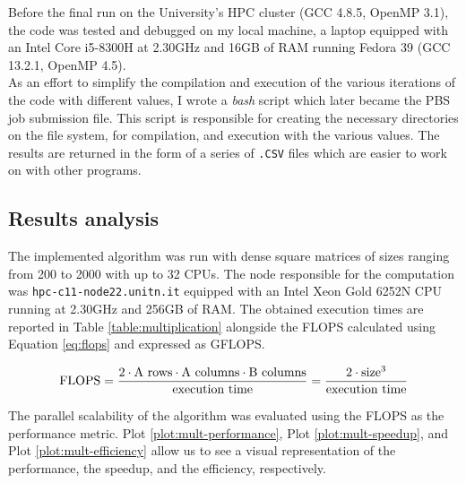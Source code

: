 

Before the final run on the University's HPC cluster (GCC 4.8.5, OpenMP 3.1), %
the code was tested and debugged on my local machine, a laptop equipped with an %
Intel\textsuperscript{\textregistered} Core\textsuperscript{\texttrademark} %
i5-8300H at 2.30GHz and 16GB of RAM running Fedora 39 (GCC 13.2.1, OpenMP 4.5).\\%
As an effort to simplify the compilation and execution of the various iterations %
of the code with different values, I wrote a \textit{bash} script which later %
became the PBS job submission file. This script is responsible for creating the %
necessary directories on the file system, for compilation, and execution with %
the various values. The results are returned in the form of a series of %
\texttt{.CSV} files which are easier to work on with other programs.

\subsection*{Results analysis}
The implemented algorithm was run with dense square matrices of sizes ranging %
from 200 to 2000 with up to 32 CPUs. The node responsible for the computation was %
\texttt{hpc-c11-node22.unitn.it} equipped with an Intel\textsuperscript{\textregistered} %
Xeon\textsuperscript{\textregistered} Gold 6252N CPU running at 2.30GHz and 256GB %
of RAM. The obtained execution times are reported in Table \ref{table:multiplication} %
alongside the FLOPS calculated using Equation \ref{eq:flops} and expressed as %
GFLOPS.

\begin{equation}
    \label{eq:flops}
    \textnormal{FLOPS}=\frac{%
            2 \cdot \textnormal{A rows} \cdot \textnormal{A columns} \cdot %
            \textnormal{B columns}
        }{\textnormal{execution time}}=
        \frac{%
            2 \cdot \textnormal{size}^3}{\textnormal{execution time}}
\end{equation}



The parallel scalability of the algorithm was evaluated using the FLOPS as the %
performance metric. Plot \ref{plot:mult-performance}, Plot \ref{plot:mult-speedup}, %
and Plot \ref{plot:mult-efficiency} allow us to see a visual representation of the %
performance, the speedup, and the efficiency, respectively.





